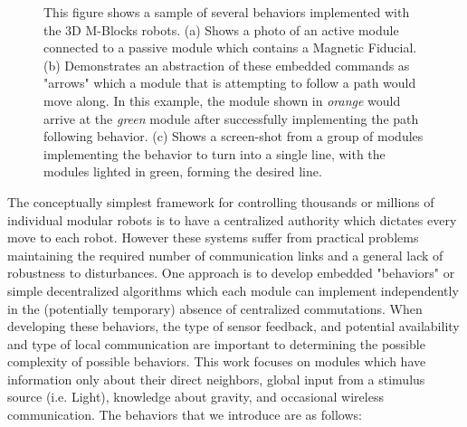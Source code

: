 \begin{figure}[t]
\begin{subfigure}[b]{\linewidth}
	\end{subfigure}
	
	
	\caption{This figure shows a sample of several behaviors implemented with the 3D M-Blocks robots. (a) Shows a photo of an active module connected to a passive module which contains a Magnetic Fiducial. (b) Demonstrates an abstraction of these embedded commands as "arrows" which a module that is attempting to follow a path would move along. In this example, the module shown in \emph{orange} would arrive at the \emph{green} module after successfully implementing the path following behavior. (c) Shows a screen-shot from a group of modules implementing the behavior to turn into a single line, with the modules lighted in green, forming the desired line.}
	
	\label{fig:intro}
\end{figure}

The conceptually simplest framework for controlling thousands or millions of individual modular robots is to have a centralized authority which dictates every move to each robot. However these systems suffer from practical problems maintaining the required number of communication links and a general lack of robustness to disturbances. One approach is to develop embedded "behaviors" or simple decentralized algorithms which each module can implement independently in the (potentially temporary) absence of centralized commutations. When developing these behaviors, the type of sensor feedback, and potential availability and type of local communication are important to determining the possible complexity of possible behaviors. This work focuses on modules which have information only about their direct neighbors, global input from a stimulus source (i.e. Light), knowledge about gravity, and occasional wireless communication. The behaviors that we introduce are as follows:

